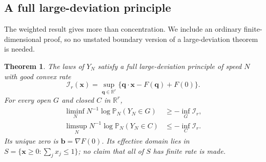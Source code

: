 \documentclass[11pt,letterpaper]{article}
\newtheorem{theorem}{Theorem}[section]
\theoremstyle{remark}\newtheorem{remark}[theorem]{Remark}
\newcommand{\R}{\mathbb R}
\newcommand{\bx}{\boldsymbol x}
\begin{document}
\subsection{A full large-deviation principle}
The weighted result gives more than concentration. We include an ordinary finite-dimensional proof, so no unstated boundary version of a large-deviation theorem is needed.

\begin{theorem}\label{amc:bm:thm:LDP}
The laws of $Y_N$ satisfy a full large-deviation principle of speed $N$ with good convex rate
\begin{equation}\label{amc:bm:eq:rate}
 \mathcal I_r(\bx)=\sup_{\boldsymbol q\in\R^r}
 \{\boldsymbol q\cdot\bx-F(\boldsymbol q)+F(0)\}.
\end{equation}
For every open $G$ and closed $C$ in $\R^r$,
\begin{align*}
 \liminf_N N^{-1}\log\mathbb P_N(Y_N\in G)&\ge-\inf_G\mathcal I_r,\\
 \limsup_N N^{-1}\log\mathbb P_N(Y_N\in C)&\le-\inf_C\mathcal I_r.
\end{align*}
Its unique zero is $\boldsymbol b=\nabla F(0)$. Its effective domain lies in
$S=\{\bx\ge0:\sum_jx_j\le1\}$; no claim that all of $S$ has finite rate is made.
\end{theorem}
\end{document}
